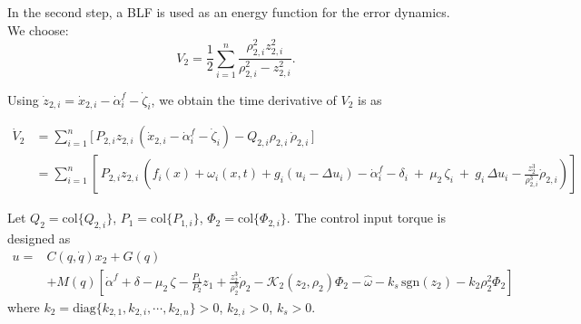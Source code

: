 \documentclass[pdflatex,sn-mathphys-num]{sn-jnl}%
\theoremstyle{thmstyleone}%
\theoremstyle{thmstyletwo}%
\theoremstyle{thmstylethree}%
\begin{document}
In the second step, a BLF is used as an energy function for the error dynamics. We choose:
\begin{equation}\label{eq:25}
	V_2= \frac{1}{2}\sum_{i=1}^{n} \frac{\rho_{2,i}^2 z_{2,i}^2}{\rho_{2,i}^2-z_{2,i}^2}. 
\end{equation}


Using $\dot z_{2,i}=\dot x_{2,i}-\dot\alpha_i^{f}-\dot\zeta_i$, we obtain the time derivative of $V_2$ is as

\begin{equation}
	\begin{aligned}
		\dot V_2& = \sum_{i=1}^n \Big[\,P_{2,i}z_{2,i}\,(\dot x_{2,i}-\dot\alpha_i^{f}-\dot\zeta_i)-Q_{2,i}\rho_{2,i}\,\dot\rho_{2,i}\,\Big]\\
		&
		 = \sum_{i=1}^n \left[\,P_{2,i}z_{2,i}\,\left(f_i(x)+\omega_i(x,t)+g_i(u_i-\Delta u_i)-\dot\alpha_i^{f}-\delta_i\ +\ \mu_2\,\zeta_i\ +\ g_i\,\Delta u_i-\tfrac{z_{2}^{3}}{\rho_{2,i}^{3}}\dot\rho_{2,i} \right)\right]
	\end{aligned}
\end{equation}

Let $Q_2=\mathrm{col}\{Q_{2,i}\}$,
$P_1=\mathrm{col}\{P_{1,i}\}$,
$\Phi_2=\mathrm{col}\{\Phi_{2,i}\}$. The control input torque is designed as
\begin{equation}\label{eq:tau-cmd}
\begin{aligned}
	u =&C(q,\dot{q})x_2 + G(q)\\
&+M(q)\left[\dot\alpha^{f}+\delta -\mu_2\,\zeta-\frac{P_1}{P_2}z_1+\tfrac{z_{2}^{3}}{\rho_{2}^{3}}\dot\rho_{2}-\mathcal{K}_{2}(z_{2},\rho_{2}) \Phi_{2}
-\hat \omega
-k_s\,\mathrm{sgn}(z_{2})-k_{2}\rho_{2}^2 \Phi_{2}\right]

\end{aligned}
\end{equation}
where $k_2=\mathrm{diag}\{k_{2,1},k_{2,i},\cdots,k_{2,n}\}>0$, $k_{2,i}>0$, $k_s>0$.


\end{document}
